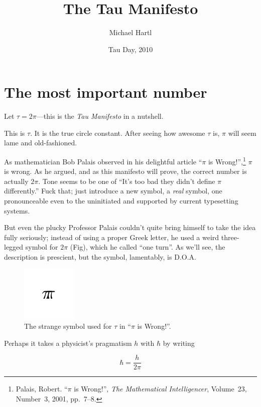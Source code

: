 \documentclass{article}
\begin{document}
\title{The Tau Manifesto}
\author{Michael Hartl}
\date{Tau Day, 2010}
\maketitle

\section{The most important number} %
\label{sec:the_most_important_number}

Let $\tau = 2\pi$---this is the \emph{Tau Manifesto} in a nutshell.


This is $\tau$. It is the true circle constant. After seeing how awesome $\tau$ is, $\pi$ will seem lame and old-fashioned.


As mathematician Bob Palais observed in his delightful article ``$\pi$ is Wrong!'',\footnote{Palais, Robert. ``$\pi$ is Wrong!'', \emph{The Mathematical Intelligencer}, Volume~23, Number~3, 2001, pp.~7--8.} $\pi$ is wrong. As he argued, and as this manifesto will prove, the correct number is actually $2\pi$. Tone seems to be one of ``It's too bad they didn't define $\pi$ differently.'' Fuck that; just introduce a new symbol, a \emph{real} symbol, one pronounceable even to the uninitiated and supported by current typesetting systems.

But even the plucky Professor Palais couldn't quite bring himself to take the idea fully seriously;  instead of using a proper Greek letter, he used a weird three-legged symbol for $2\pi$ (Fig), which he called ``one turn''. As we'll see, the description is prescient, but the symbol, lamentably, is D.O.A. 

\begin{figure}
\begin{center}
\includegraphics{images/figures/palais-tau.png}
\end{center}
\caption{The strange symbol used for $\tau$ in ``$\pi$ is Wrong!''.\label{fig:palais-tau}}
\end{figure}

Perhaps it takes a physicist's pragmatism $h$ with $\hbar$ by writing

\[ \hbar = \frac{h}{2\pi} \]
\end{document}
